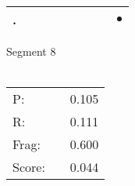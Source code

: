 \documentclass[landscape]{article}
\newcommand{\ssp}{\hspace{2pt}}
\newcommand{\mex}{\cellcolor{g}$\bullet$}
\begin{document}
\begin{tabular}{|l|p{10pt}|p{10pt}|p{10pt}|p{10pt}|p{10pt}|p{10pt}|p{10pt}|p{10pt}|}
\hline
\ssp \cellcolor{ref7}. \ssp&\hspace{2pt}&\hspace{2pt}&\hspace{2pt}&\hspace{2pt}&\hspace{2pt}&\hspace{2pt}&\hspace{2pt}&\hspace{2pt}\mex\\
\hline
\end{tabular}

\vspace{6pt}
\noindent Segment 8\\\\
\noindent\begin{tabular}{lm{12pt}r}
\hline
P:&&0.105\\
R:&&0.111\\
Frag:&&0.600\\
Score:&&0.044\\
\end{tabular}

\newpage
\end{document}
